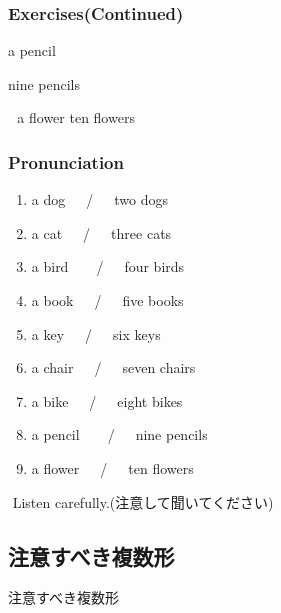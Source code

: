 \documentclass[aspectratio=169]{beamer}
\newcommand{\myaudio}[1]{\href{#1}{\faVolumeUp}}
\begin{document}
\begin{frame}[plain]\frametitle{Exercises(Continued)}

\pause a pencil\hspace{20pt}%
\pause
{}\hspace{15pt}
\pause

\mbox{}\hspace{.8\textwidth} nine pencils
\pause


\bcfleur\,\,\,\,\pause a flower\hspace{45pt}%
\pause
\bcfleur\bcfleur\bcfleur\bcfleur\bcfleur\hspace{15pt}
\bcfleur\bcfleur\bcfleur\bcfleur\bcfleur\hspace{10pt}
\pause
ten flowers
\end{frame}


\begin{frame}[plain]\frametitle{Pronunciation}

\begin{enumerate}
 \item a dog~~~/~~~two dogs
 \item a cat~~~/~~~three cats
 \item a bird~~~~/~~~four birds
 \item a book~~~/~~~five books
 \item a key~~~/~~~six keys
 \item a chair~~~/~~~seven chairs
 \item a bike~~~/~~~eight bikes
 \item a pencil~~~~/~~~nine pencils
 \item a flower~~~/~~~ten flowers
\end{enumerate}

\pause
\myaudio{./audio/005_singular_plural_01.mp3}\,\,{}Listen carefully.(注意して聞いてください)

\end{frame}

\subsection{注意すべき複数形}

\begin{frame}[plain]{注意すべき複数形}

\hspace{15pt}
\pause

\bigskip

\bigskip

\hspace{15pt}
\end{frame}
\end{document}
